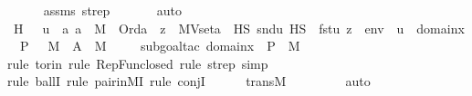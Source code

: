 \begin{isabellebody}
\ \ \ \ \isamarkupfalse%
\ assms\ strep\ \isanewline
\ \ \ \ \isamarkupfalse%
\ auto\isanewline
\isanewline
\ \ \isamarkupfalse%
\ H\ {\isacharcolon}{\kern0pt}\ {\isachardoublequoteopen}{\isacharbraceleft}{\kern0pt}\ {\isacharless}{\kern0pt}u{\isacharcomma}{\kern0pt}\ {\isacharparenleft}{\kern0pt}{\isasymmu}\ a{\isachardot}{\kern0pt}\ a\ {\isasymin}\ M\ {\isasymand}\ Ord{\isacharparenleft}{\kern0pt}a{\isacharparenright}{\kern0pt}\ {\isasymand}\ {\isacharparenleft}{\kern0pt}{\isasymexists}z\ {\isasymin}\ MVset{\isacharparenleft}{\kern0pt}a{\isacharparenright}{\kern0pt}\ {\isasyminter}\ HS{\isachardot}{\kern0pt}\ snd{\isacharparenleft}{\kern0pt}u{\isacharparenright}{\kern0pt}\ {\isasymtturnstile}HS\ {\isasymphi}\ {\isacharparenleft}{\kern0pt}{\isacharbrackleft}{\kern0pt}fst{\isacharparenleft}{\kern0pt}u{\isacharparenright}{\kern0pt}{\isacharcomma}{\kern0pt}\ z{\isacharbrackright}{\kern0pt}\ {\isacharat}{\kern0pt}\ env{\isacharparenright}{\kern0pt}{\isacharparenright}{\kern0pt}{\isacharparenright}{\kern0pt}{\isachargreater}{\kern0pt}\ {\isachardot}{\kern0pt}\ u\ {\isasymin}\ domain{\isacharparenleft}{\kern0pt}x{\isacharparenright}{\kern0pt}\ {\isasymtimes}\ P\ {\isacharbraceright}{\kern0pt}\ {\isasymin}\ M{\isachardoublequoteclose}\ {\isacharparenleft}{\kern0pt}\ {\isachardoublequoteopen}{\isacharquery}{\kern0pt}A\ {\isasymin}\ M{\isachardoublequoteclose}{\isacharparenright}{\kern0pt}\isanewline
\ \ \ \ \isamarkupfalse%
{\isacharparenleft}{\kern0pt}subgoal{\isacharunderscore}{\kern0pt}tac\ {\isachardoublequoteopen}domain{\isacharparenleft}{\kern0pt}x{\isacharparenright}{\kern0pt}\ {\isasymtimes}\ P\ {\isasymin}\ M{\isachardoublequoteclose}{\isacharparenright}{\kern0pt}\isanewline
\ \ \ \ \isamarkupfalse%
{\isacharparenleft}{\kern0pt}rule\ to{\isacharunderscore}{\kern0pt}rin{\isacharcomma}{\kern0pt}\ rule\ RepFun{\isacharunderscore}{\kern0pt}closed{\isacharcomma}{\kern0pt}\ rule\ strep{\isacharprime}{\kern0pt}{\isacharcomma}{\kern0pt}\ simp{\isacharparenright}{\kern0pt}\isanewline
\ \ \ \ \isamarkupfalse%
{\isacharparenleft}{\kern0pt}rule\ ballI{\isacharcomma}{\kern0pt}\ rule\ pair{\isacharunderscore}{\kern0pt}in{\isacharunderscore}{\kern0pt}MI{\isacharcomma}{\kern0pt}\ rule\ conjI{\isacharparenright}{\kern0pt}\isanewline
\ \ \ \ \isamarkupfalse%
\ transM\ \isanewline
\ \ \ \ \ \ \isamarkupfalse%
\ auto{\isacharbrackleft}{\kern0pt}{}{\isacharbrackright}{\kern0pt}\isanewline
\ \ \ \ \ \isamarkupfalse%

\end{isabellebody}
